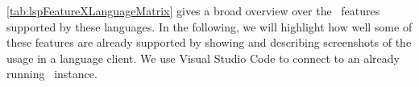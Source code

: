 \documentclass[sigplan,10pt,review,anonymous]{acmart}
\begin{document}

\autoref{tab:lspFeatureXLanguageMatrix} gives a broad overview over the
\graallsp~features supported by these languages. In the following, we will
highlight how well some of these features are already supported by showing and
describing screenshots of the usage in a language client. We use Visual Studio
Code to connect to an already running \graallsp~instance.

\newcommand{\cmark}{\ding{51}}
\newcommand{\xmark}{\ding{55}}
\newcommand{\nyi}{\xmark}
\end{document}
